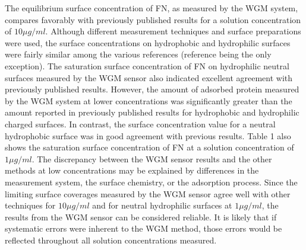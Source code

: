 The equilibrium surface concentration of FN, as measured by the WGM
system, compares favorably with previously published results for a
solution concentration of $10\mu g/ml$. Although different measurement
techniques and surface preparations were used, the surface concentrations
on hydrophobic and hydrophilic surfaces were fairly similar among
the various references (reference \cite{Lee2006} being the only exception).
The saturation surface concentration of FN on hydrophilic neutral
surfaces measured by the WGM sensor also indicated excellent agreement
with previously published results. However, the amount of adsorbed
protein measured by the WGM system at lower concentrations was significantly
greater than the amount reported in previously published results for
hydrophobic and hydrophilic charged surfaces. In contrast, the surface
concentration value for a neutral hydrophobic surface was in good
agreement with previous results. Table 1 also shows the saturation
surface concentration of FN at a solution concentration of $1\mu g/ml$.
The discrepancy between the WGM sensor results and the other methods
at low concentrations may be explained by differences in the measurement
system, the surface chemistry, or the adsorption process. Since the
limiting surface coverages measured by the WGM sensor agree well with
other techniques for $10\mu g/ml$ and for neutral hydrophilic surfaces
at $1\mu g/ml$, the results from the WGM sensor can be considered
reliable. It is likely that if systematic errors were inherent to
the WGM method, those errors would be reflected throughout all solution
concentrations measured. 

